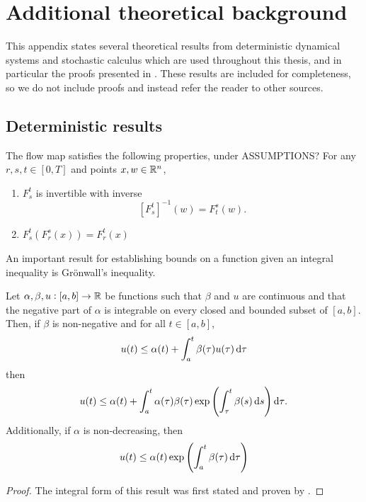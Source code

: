 \chapter{Additional theoretical background}\label{app:theory}
This appendix states several theoretical results from deterministic dynamical systems and stochastic calculus which are used throughout this thesis, and in particular the proofs presented in .
These results are included for completeness, so we do not include proofs and instead refer the reader to other sources.

\section{Deterministic results}
The flow map satisfies the following properties, under ASSUMPTIONS?
For any \(r, s, t \in [0,T]\) and points \(x,w \in \mathbb{R}^n\),
\begin{enumerate}
	\item \(F_{s}^{t}\) is invertible with inverse
	      \[
		      \left[F_{s}^{t}\right]^{-1}\left(w\right) = F_{t}^{s}\left(w\right).
	      \]
	\item \(F_s^{t}\left(F_{r}^{s}(x)\right) = F_{r}^{t}\left(x\right)\)
\end{enumerate}


An important result for establishing bounds on a function given an integral inequality is Gr\"onwall's inequality.

\begin{theorem}\label{thm:gronwall}
	Let \(\alpha, \beta, u: [a,b] \to \mathbb{R}\) be functions such that \(\beta\) and \(u\) are continuous and that the negative part of \(\alpha\) is integrable on every closed and bounded subset of \([a,b]\).
	Then, if \(\beta\) is non-negative and for all \(t \in [a,b]\),
	\[
		u(t) \leq \alpha(t) + \int_a^t{\beta(\tau)u(\tau)\dif\tau}
	\]
	then
	\[
		u(t) \leq \alpha(t) + \int_a^t{\alpha(\tau)\beta(\tau)\exp\left(\int_\tau^{t}{\beta(s)\dif s}\right)\dif\tau}.
	\]
	Additionally, if \(\alpha\) is non-decreasing, then
	\[
		u(t) \leq \alpha(t) \exp\left(\int_a^t{\beta(\tau)\dif\tau}\right)
	\]
\end{theorem}
\begin{proof}
	The integral form of this result was first stated and proven by \citet{Bellman_1943_StabilitySolutionsLinear}.
\end{proof}


